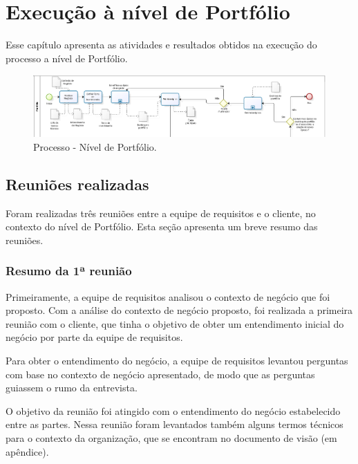 \chapter{Execução à nível de Portfólio}
  
  Esse capítulo apresenta as atividades e resultados obtidos na execução do processo a nível de Portfólio.
  
  \begin{figure}[!htbp]
    \centering
    \includegraphics[scale=0.33]{figuras/processo_portfolio}
    \caption[Processo - Nível de Portfólio]{Processo - Nível de Portfólio.}
    \label{processo_portfolio}
  \end{figure}
   
  \section{Reuniões realizadas}
    
    Foram realizadas três reuniões entre a equipe de requisitos e o cliente, no contexto do nível de Portfólio.
    Esta seção apresenta um breve resumo das reuniões.
    
    \subsection{Resumo da 1ª reunião}
      
      Primeiramente, a equipe de requisitos analisou o contexto de negócio que foi proposto.
      Com a análise do contexto de negócio proposto, foi realizada a primeira reunião com o cliente, que tinha o objetivo de 
      obter um entendimento inicial do negócio por parte da equipe de requisitos. 
      
      Para obter o entendimento do negócio, a equipe de requisitos levantou perguntas com base no contexto de negócio apresentado, 
      de modo que as perguntas guiassem o rumo da entrevista.
      
      O objetivo da reunião foi atingido com o entendimento do negócio estabelecido entre as partes. Nessa reunião 
      foram levantados também alguns termos técnicos para o contexto da organização, que se encontram no documento de visão
      (em apêndice).
      
